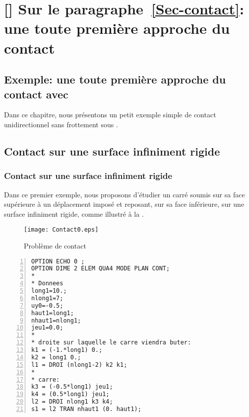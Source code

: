 \ifVersionAvecExemplesSepares
  \chapter{[\castem] Sur le paragraphe~\ref{Sec-contact}: une toute première approche du contact}
\else
  \section{Exemple: une toute première approche du contact avec \castem}
\fi

Dans ce chapitre, nous présentons un petit exemple simple de contact unidirectionnel 
sans frottement sous \castem.





\medskip
\ifVersionAvecExemplesSepares
  \section{Contact sur une surface infiniment rigide}
\else
  \subsection{Contact sur une surface infiniment rigide}
\fi

Dans ce premier exemple, nous proposons d'étudier un carré soumis sur sa face supérieure à un
déplacement imposé et reposant, sur sa face inférieure, sur une surface infiniment rigide, comme illustré
à la .
\begin{figure}[ht]
  \center
  \texttt{[image: Contact0.eps]}
  \caption{\label{Fig-Cont0} Problème de contact}
\end{figure}

\color{gris}\scriptsize
\begin{multicols}{2}
\begin{Verbatim}[numbers=left,numbersep=3pt]
OPTION ECHO 0 ;
OPTION DIME 2 ELEM QUA4 MODE PLAN CONT;
*
* Donnees
long1=10.;
nlong1=7;
uy0=-0.5;
haut1=long1;
nhaut1=nlong1;
jeu1=0.0;
*
* droite sur laquelle le carre viendra buter:
k1 = (-1.*long1) 0.;
k2 = long1 0.;
l1 = DROI (nlong1-2) k2 k1;
*
* carre:
k3 = (-0.5*long1) jeu1;
k4 = (0.5*long1) jeu1;
l2 = DROI nlong1 k3 k4;
s1 = l2 TRAN nhaut1 (0. haut1);
\end{Verbatim}
\end{multicols}
\color{black}\normalsize

